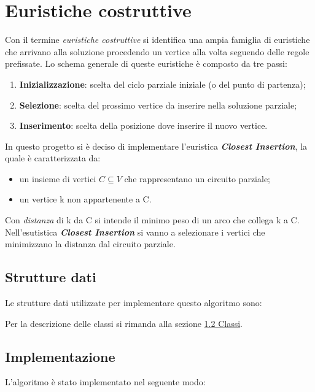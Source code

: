 \section{Euristiche costruttive}
\label{EuristicheCostruttive}

Con il termine \textit{euristiche costruttive} si identifica una ampia famiglia di euristiche che arrivano alla
soluzione procedendo un vertice alla volta seguendo delle regole prefissate. Lo schema generale di
queste euristiche è composto da tre passi:

\begin{enumerate}
    \item \textbf{Inizializzazione}: scelta del ciclo parziale iniziale (o del punto di partenza);
    \item \textbf{Selezione}: scelta del prossimo vertice da inserire nella soluzione parziale;
    \item \textbf{Inserimento}: scelta della posizione dove inserire il nuovo vertice.
\end{enumerate}

In questo progetto si è deciso di implementare l'euristica \textbf{\textit{Closest Insertion}}, la quale è caratterizzata da:

\begin{itemize}
    \item un insieme di vertici $C \subseteq V$ che rappresentano un circuito parziale;
    \item un vertice k non appartenente a C.
\end{itemize}

Con \textit{distanza} di k da C si intende il minimo peso di un arco che collega k a C. Nell'esutistica \textbf{\textit{Closest Insertion}} si vanno a selezionare i vertici che minimizzano la distanza dal circuito parziale.

\subsection{Strutture dati}
\label{struttureDati2}

Le strutture dati utilizzate per implementare questo algoritmo sono:


Per la descrizione delle classi si rimanda alla sezione \hyperlink{section.2}{1.2 Classi}.
\newline

\subsection{Implementazione}
\label{implementazione2}

L'algoritmo è stato implementato nel seguente modo:

